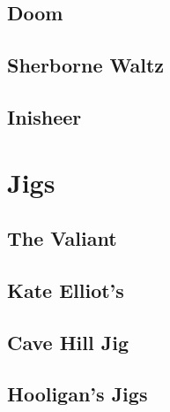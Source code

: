 \documentclass[letterpaper,10pt,english]{sphinxmanual}
\begin{document}
\subsection{Doom}
\label{\detokenize{Other Tunes/Waltzes:doom}}
\noindent{}


\subsection{Sherborne Waltz}
\label{\detokenize{Other Tunes/Waltzes:sherborne-waltz}}
\noindent{}


\subsection{Inisheer}
\label{\detokenize{Other Tunes/Waltzes:inisheer}}
\noindent{}


\section{Jigs}
\label{\detokenize{Other Tunes/Jigs:jigs}}\label{\detokenize{Other Tunes/Jigs::doc}}

\subsection{The Valiant}
\label{\detokenize{Other Tunes/Jigs:the-valiant}}
\noindent{}


\subsection{Kate Elliot’s}
\label{\detokenize{Other Tunes/Jigs:kate-elliot-s}}
\noindent{}


\subsection{Cave Hill Jig}
\label{\detokenize{Other Tunes/Jigs:cave-hill-jig}}
\noindent{}


\subsection{Hooligan’s Jigs}
\label{\detokenize{Other Tunes/Jigs:hooligan-s-jigs}}
\noindent{}
\end{document}
